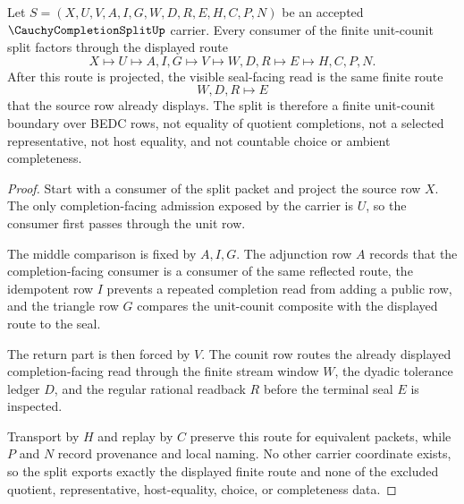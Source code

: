 \begin{theorem}
\label{thm:cauchy-completion-split-unit-counit-route}
Let $S=(X,U,V,A,I,G,W,D,R,E,H,C,P,N)$ be an accepted $\CauchyCompletionSplitUp$ carrier. Every consumer of the finite unit-counit split factors through the displayed route
$$
X\longmapsto U\longmapsto A,I,G\longmapsto V\longmapsto W,D,R\longmapsto E\longmapsto H,C,P,N .
$$
After this route is projected, the visible seal-facing read is the same finite route
$$
W,D,R\longmapsto E
$$
that the source row already displays. The split is therefore a finite unit-counit boundary over BEDC rows, not equality of quotient completions, not a selected representative, not host equality, and not countable choice or ambient completeness.
\end{theorem}
\begin{proof}
Start with a consumer of the split packet and project the source row $X$. The only completion-facing admission exposed by the carrier is $U$, so the consumer first passes through the unit row.

The middle comparison is fixed by $A,I,G$. The adjunction row $A$ records that the completion-facing consumer is a consumer of the same reflected route, the idempotent row $I$ prevents a repeated completion read from adding a public row, and the triangle row $G$ compares the unit-counit composite with the displayed route to the seal.

The return part is then forced by $V$. The counit row routes the already displayed completion-facing read through the finite stream window $W$, the dyadic tolerance ledger $D$, and the regular rational readback $R$ before the terminal seal $E$ is inspected.

Transport by $H$ and replay by $C$ preserve this route for equivalent packets, while $P$ and $N$ record provenance and local naming. No other carrier coordinate exists, so the split exports exactly the displayed finite route and none of the excluded quotient, representative, host-equality, choice, or completeness data.
\end{proof}

